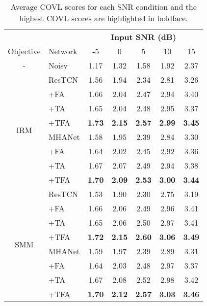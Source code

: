 \begin{table}[!h]
    \centering
    \scriptsize
    \def\arraystretch{0.99}
    \setlength{\tabcolsep}{5.5pt}
    \caption{Average COVL scores for each SNR condition and the highest COVL scores are highlighted in boldface.}
    \label{tab:covl}
    \begin{tabular}{@{}cl||ccccc@{}}
        \hline
        &  & \multicolumn{5}{c}{\textbf{Input SNR (dB)}}\\  
        \cline{3-7}
        Objective & Network & -5 & 0 & 5 & 10 & 15 \\
        \hline
        - & Noisy & 1.17 & 1.32 & 1.58 & 1.92 & 2.37 \\
        \hline
        \hline
        \multirow{8}{*}{IRM}
        & ResTCN & 1.56 & 1.94 & 2.34 & 2.81 & 3.26 \\
        & +FA    & 1.66 & 2.04 & 2.47 & 2.94 & 3.40 \\
        & +TA    & 1.65 & 2.04 & 2.48 & 2.95 & 3.37 \\
        & +TFA   & \textbf{1.73} & \textbf{2.15} & \textbf{2.57} & \textbf{2.99} & \textbf{3.45} \\
        \cline{2-7}
        & MHANet & 1.58 & 1.95 & 2.39 & 2.84 & 3.30 \\
        & +FA    & 1.64 & 2.02 & 2.45 & 2.92 & 3.36 \\
        & +TA    & 1.67 & 2.07 & 2.49 & 2.94 & 3.38 \\
        & +TFA   & \textbf{1.70} & \textbf{2.09} & \textbf{2.53} & \textbf{3.00} & \textbf{3.44} \\
        \hline
        \hline
        
        \multirow{8}{*}{SMM}
        & ResTCN & 1.53 & 1.90 & 2.30 & 2.75 & 3.19 \\
        & +FA    & 1.66 & 2.06 & 2.49 & 2.96 & 3.41 \\
        & +TA    & 1.65 & 2.06 & 2.50 & 2.97 & 3.41 \\
        & +TFA   & \textbf{1.72} & \textbf{2.15} & \textbf{2.60} & \textbf{3.06} & \textbf{3.49} \\
        \cline{2-7}
        & MHANet & 1.59 & 1.97 & 2.39 & 2.89 & 3.31 \\
        & +FA    & 1.64 & 2.03 & 2.48 & 2.97 & 3.37 \\
        & +TA    & 1.67 & 2.08 & 2.52 & 2.98 & 3.42 \\
        & +TFA   & \textbf{1.70} & \textbf{2.12} & \textbf{2.57} & \textbf{3.03} & \textbf{3.46} \\
        \hline
        \hline
        

\end{tabular}
\end{table}
